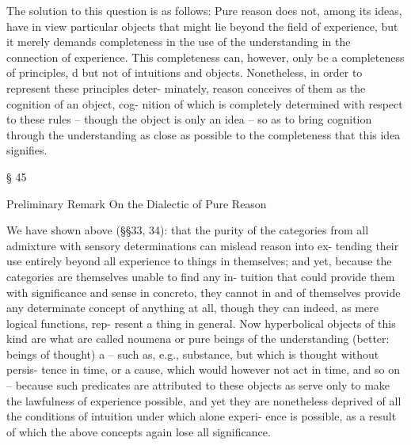 The solution to this question is as follows: Pure reason does not,
among its ideas, have in view particular objects that might lie beyond
the ﬁeld of experience, but it merely demands completeness in the use of
the understanding in the connection of experience. This completeness
can, however, only be a completeness of principles, d but not of intuitions
and objects. Nonetheless, in order to represent these principles deter-
minately, reason conceives of them as the cognition of an object, cog-
nition of which is completely determined with respect to these rules –
though the object is only an idea – so as to bring cognition through
the understanding as close as possible to the completeness that this idea
signiﬁes.

§ 45

Preliminary Remark On the Dialectic of Pure Reason

We have shown above (§§33, 34): that the purity of the categories from
all admixture with sensory determinations can mislead reason into ex-
tending their use entirely beyond all experience to things in themselves;
and yet, because the categories are themselves unable to ﬁnd any in-
tuition that could provide them with signiﬁcance and sense in concreto,
they cannot in and of themselves provide any determinate concept of
anything at all, though they can indeed, as mere logical functions, rep-
resent a thing in general. Now hyperbolical objects of this kind are what
are called noumena or pure beings of the understanding (better: beings
of thought) a – such as, e.g., substance, but which is thought without persis-
tence in time, or a cause, which would however not act in time, and so on –
because such predicates are attributed to these objects as serve only to
make the lawfulness of experience possible, and yet they are nonetheless
deprived of all the conditions of intuition under which alone experi-
ence is possible, as a result of which the above concepts again lose all
signiﬁcance.

